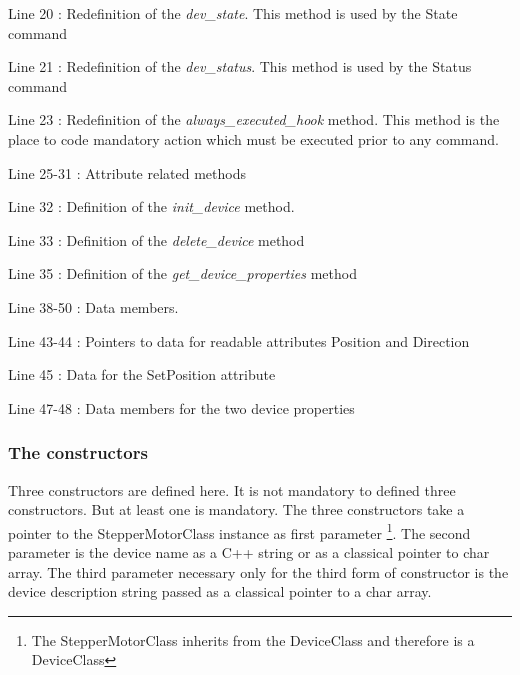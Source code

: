 Line 20 : Redefinition of the \emph{dev\_state}.
This method is used by the State command

Line 21 : Redefinition of the \emph{dev\_status}.
This method is used by the Status command

Line 23 : Redefinition of the \emph{always\_executed\_hook}
method. This method is the place to code mandatory action which must
be executed prior to any command.

Line 25-31 : Attribute related methods

Line 32 : Definition of the \emph{init\_device}
method.

Line 33 : Definition of the \emph{delete\_device}
method

Line 35 : Definition of the \emph{get\_device\_properties} method

Line 38-50 : Data members. 

Line 43-44 : Pointers to data for readable attributes Position and
Direction

Line 45 : Data for the SetPosition attribute

Line 47-48 : Data members for the two device properties


\subsubsection{The constructors}

Three constructors are defined here. It is not mandatory to defined
three constructors. But at least one is mandatory. The three constructors
take a pointer to the StepperMotorClass instance as first parameter%
\footnote{The StepperMotorClass inherits from the DeviceClass and therefore
is a DeviceClass%
}. The second parameter is the device name as a C++ string or as a
classical pointer to char array. The third parameter necessary only
for the third form of constructor is the device description string
passed as a classical pointer to a char array.

